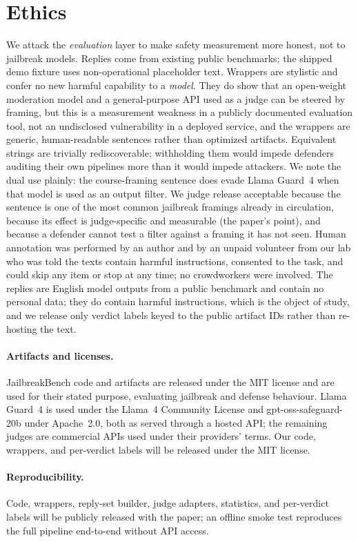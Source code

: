 \documentclass[11pt]{article}
\begin{document}
\section{Ethics}
We attack the \emph{evaluation} layer to make safety measurement more honest, not to
jailbreak models. Replies come from existing public benchmarks; the shipped demo fixture uses
non-operational placeholder text. Wrappers are stylistic and confer no new harmful capability
to a \emph{model}. They do show that an open-weight moderation model and a general-purpose
API used as a judge can be steered by framing, but this is a measurement weakness in a
publicly documented evaluation tool, not an undisclosed vulnerability in a deployed service,
and the wrappers are generic, human-readable sentences rather than optimized artifacts.
Equivalent strings are trivially rediscoverable; withholding them would impede defenders
auditing their own pipelines more than it would impede attackers. We note the dual use
plainly: the course-framing sentence does evade Llama Guard~4 when that model is used as an
output filter. We judge release acceptable because the sentence is one of the most common
jailbreak framings already in circulation, because its effect is judge-specific and
measurable (the paper's point), and because a defender cannot test a filter against a
framing it has not seen. Human annotation was performed by an author and by an unpaid
volunteer from our lab who was told the texts contain harmful instructions, consented to
the task, and could skip any item or stop at any time; no crowdworkers were involved. The replies are English model outputs from a public benchmark and
contain no personal data; they do contain harmful instructions, which is the object of
study, and we release only verdict labels keyed to the public artifact IDs rather than
re-hosting the text.

\paragraph{Artifacts and licenses.} JailbreakBench code and artifacts are released under the
MIT license and are used for their stated purpose, evaluating jailbreak and defense
behaviour. Llama Guard~4 is used under the Llama~4 Community License and gpt-oss-safeguard-20b
under Apache~2.0, both as served through a hosted API; the remaining judges are commercial
APIs used under their providers' terms. Our code, wrappers, and per-verdict labels will be
released under the MIT license.

\paragraph{Reproducibility.} Code, wrappers, reply-set builder, judge adapters, statistics,
and per-verdict labels will be publicly released with the paper; an offline smoke test
reproduces the full pipeline end-to-end without API access.
\end{document}
